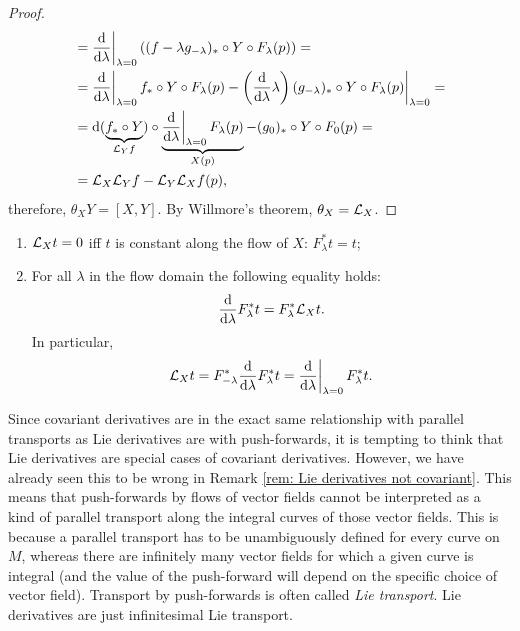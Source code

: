 \begin{proof}
\begin{align}
        &=\restr{\frac{\dd}{\dd \lambda}}{\lambda=0} \left((f-\lambda g_{-\lambda})_\ast\circ Y\circ F_\lambda(p)\right)=\\
        &=\restr{\frac{\dd}{\dd \lambda}}{\lambda=0} f_\ast\circ Y\circ F_\lambda (p)-\restr{\left(\frac{\dd}{\dd \lambda}\lambda\right)(g_{-\lambda})_\ast\circ Y\circ F_\lambda(p)}{\lambda=0}=\\
        &=\dd(\underbrace{f_\ast\circ Y}_{\Lie_Yf})\circ \underbrace{\restr{\frac{\dd}{\dd \lambda}}{\lambda=0} F_\lambda(p)}_{X(p)}-(g_0)_\ast \circ Y\circ F_0(p)=\\
        &=\Lie_X\Lie_Y f-\Lie_Y\Lie_X f(p),
    \end{align}
    therefore, $\theta_X Y=[X,Y]$. By Willmore's theorem, $\theta_X=\mathcal{L}_X$.
\end{proof}
\begin{cor}
\begin{enumerate}
    \item $\mathcal{L}_X t=0$ iff $t$ is constant along the flow of $X$: $F^\ast_\lambda t=t$;
    \item For all $\lambda$ in the flow domain the following equality holds:
    \[\frac{{\mathrm{d}}}{{\mathrm{d}} \lambda}F^\ast_\lambda t=F^\ast_\lambda \mathcal{L}_X t.\]
    In particular, 
    \[\Lie_X t=F^\ast_{-\lambda} \frac{\dd}{\dd \lambda}F^\ast_\lambda t=\restr{\frac{\dd}{\dd\lambda}}{\lambda=0}F^\ast_\lambda t.\]
\end{enumerate}
\end{cor}

\begin{rem}
    Since covariant derivatives are in the exact same relationship with parallel transports as Lie derivatives are with push-forwards, it is tempting to think that Lie derivatives are special cases of covariant derivatives. However, we have already seen this to be wrong in Remark \ref{rem: Lie derivatives not covariant}. This means that push-forwards by flows of vector fields cannot be interpreted as a kind of parallel transport along the integral curves of those vector fields. This is because a parallel transport has to be unambiguously defined for every curve on $M$, whereas there are infinitely many vector fields for which a given curve is integral (and the value of the push-forward will depend on the specific choice of vector field). Transport by push-forwards is often called \emph{Lie transport}. Lie derivatives are just infinitesimal Lie transport.
\end{rem}

